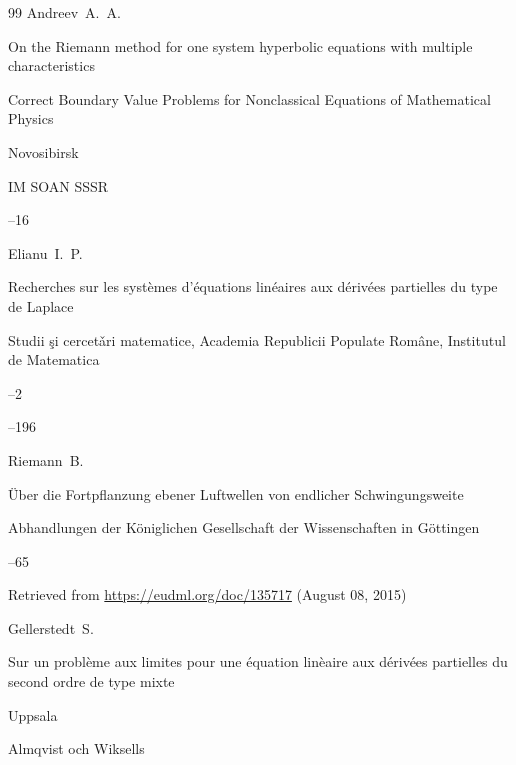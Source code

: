 \begin{thebibliography}{99}
\by Andreev~A.~A.

\paper  On the Riemann method for one system hyperbolic equations with multiple characteristics

\inbook Correct Boundary Value Problems for Nonclassical Equations of Mathematical Physics

\publaddr Novosibirsk

\publ IM SOAN SSSR


--16






\by  Elianu~I.~P.

\paper Recherches sur les syst\`emes d'\'equations lin\'eaires aux d\'eriv\'ees partielles du type de Laplace

\jour Studii \c{s}i cercet\v{a}ri matematice, Academia Republicii Populate Rom\^{a}ne, Institutul de Matematica



--2

--196





\by  Riemann~B.

\paper \"Uber die Fortpflanzung ebener Luftwellen von endlicher Schwingungsweite

\jour  Abhandlungen der K\"oniglichen Gesellschaft der Wissenschaften in G\"ottingen



--65

\elink  Retrieved from   \url{https://eudml.org/doc/135717} (August 08, 2015)










\by   Gellerstedt~S.

\book Sur un probl\`eme aux limites pour une \'equation lin\`eaire aux d\'eriv\'ees partielles du second ordre de type mixte

\publaddr Uppsala

\publ Almqvist och Wiksells 


\end{thebibliography}
